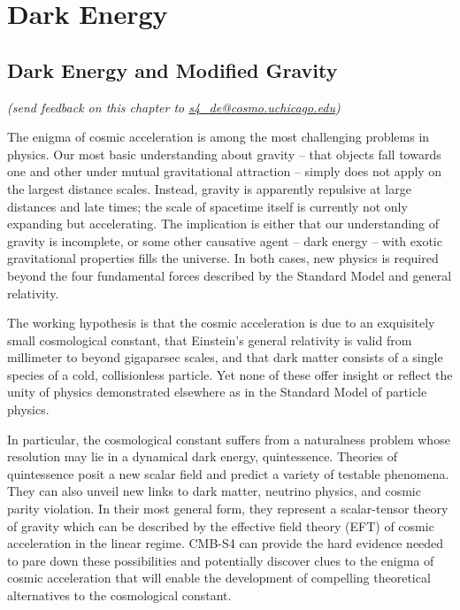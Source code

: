 
\chapter{Dark Energy}

\section{Dark Energy and Modified Gravity}

\begin{center}
{\small \it (send feedback on this chapter to \href{mailto:s4_de@cosmo.uchicago.edu}{s4\_de@cosmo.uchicago.edu})}
\end{center}

The enigma of cosmic acceleration is among the most challenging problems in physics. Our most basic understanding about gravity -- that objects fall towards one and other under mutual gravitational attraction -- simply does not apply on the largest distance scales. Instead, gravity is apparently repulsive at large distances and late times; the scale of spacetime itself is currently not only expanding but accelerating. The implication is either that our understanding of gravity is incomplete, or some other causative agent -- dark energy -- with exotic gravitational properties fills the universe. In both cases, new physics is required beyond the four fundamental forces described by the Standard Model and general relativity.

The working hypothesis is that the cosmic acceleration is due to an exquisitely small cosmological constant, that Einstein's general relativity is valid from millimeter to beyond gigaparsec scales, and that dark matter consists of a single species of a cold, collisionless particle. Yet none of these offer insight or reflect the unity of physics demonstrated elsewhere as in the Standard Model of particle physics.

In particular, the cosmological constant suffers from a naturalness problem whose resolution may lie in a dynamical dark energy, quintessence. Theories of quintessence posit a new scalar field and predict a variety of testable phenomena.  They can also unveil new links to dark matter, neutrino physics, and cosmic parity violation. In their most general form, they represent
a scalar-tensor theory of gravity which can be described by  the effective field theory (EFT) of cosmic acceleration in the linear regime. 
CMB-S4 can provide the hard evidence  needed to pare down these possibilities and potentially discover clues to the enigma of cosmic acceleration that will enable the development of  compelling theoretical 
alternatives to the cosmological constant.

